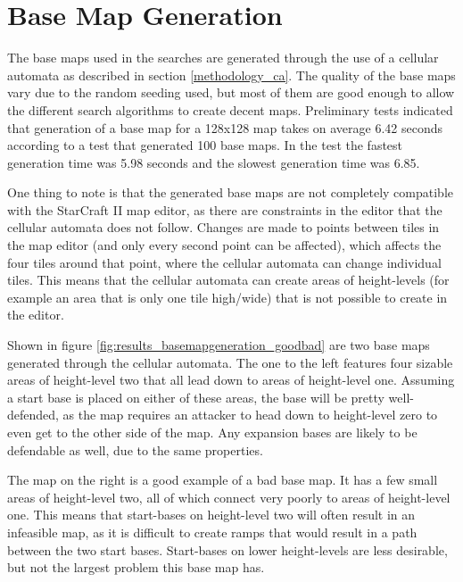 \section{Base Map Generation}
\label{results_basemapgeneration}
The base maps used in the searches are generated through the use of a cellular automata as described in section \ref{methodology_ca}. The quality of the base maps vary due to the random seeding used, but most of them are good enough to allow the different search algorithms to create decent maps. Preliminary tests indicated that generation of a base map for a 128x128 map takes on average 6.42 seconds according to a test that generated 100 base maps. In the test the fastest generation time was 5.98 seconds and the slowest generation time was 6.85.

One thing to note is that the generated base maps are not completely compatible with the StarCraft II map editor, as there are constraints in the editor that the cellular automata does not follow. Changes are made to points between tiles in the map editor (and only every second point can be affected), which affects the four tiles around that point, where the cellular automata can change individual tiles. This means that the cellular automata can create areas of height-levels (for example an area that is only one tile high/wide) that is not possible to create in the editor.


Shown in figure \ref{fig:results_basemapgeneration_goodbad} are two base maps generated through the cellular automata. The one to the left features four sizable areas of height-level two that all lead down to areas of height-level one. Assuming a start base is placed on either of these areas, the base will be pretty well-defended, as the map requires an attacker to head down to height-level zero to even get to the other side of the map. Any expansion bases are likely to be defendable as well, due to the same properties.

The map on the right is a good example of a bad base map. It has a few small areas of height-level two, all of which connect very poorly to areas of height-level one. This means that start-bases on height-level two will often result in an infeasible map, as it is difficult to create ramps that would result in a path between the two start bases. Start-bases on lower height-levels are less desirable, but not the largest problem this base map has. 

